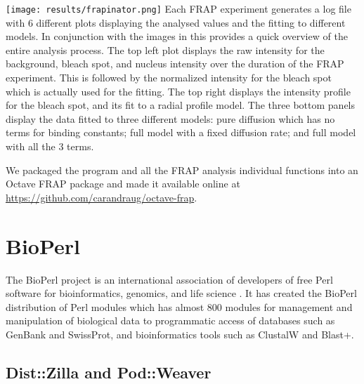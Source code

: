 \begin{sidewaysfigure}
  \texttt{[image: results/frapinator.png]}
               {Each FRAP experiment generates a log file with 6
                 different plots displaying the analysed values and
                 the fitting to different models.  In conjunction with
                 the images in  this
                 provides a quick overview of the entire analysis
                 process.  The top left plot displays the raw
                 intensity for the background, bleach spot, and
                 nucleus intensity over the duration of the FRAP
                 experiment. This is followed by the normalized
                 intensity for the bleach spot which is actually used
                 for the fitting. The top right displays the intensity
                 profile for the bleach spot, and its fit to a radial
                 profile model. The three bottom panels display the
                 data fitted to three different models: pure diffusion
                 which has no terms for binding constants; full model
                 with a fixed diffusion rate; and full model with all
                 the 3 terms.  }
               \label{fig:software:frapinator}
\end{sidewaysfigure}

We packaged the  program and all the FRAP analysis
individual functions into an Octave FRAP package and made it available
online at \url{https://github.com/carandraug/octave-frap}.

\section{BioPerl}

The BioPerl project is an international association of developers of
free Perl software for bioinformatics, genomics, and life science
\citep{bioperl}.  It has created the BioPerl distribution of Perl
modules which has almost 800 modules for management and manipulation
of biological data to programmatic access of databases such as GenBank
and SwissProt, and bioinformatics tools such as ClustalW and Blast+.


\subsection{Dist::Zilla and Pod::Weaver}

